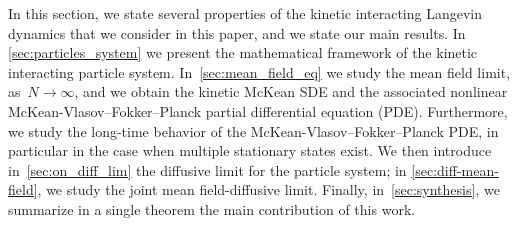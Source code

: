 \documentclass[onefignum,onetabnum]{siamart251216} %
\theoremstyle{plain}
\numberwithin{equation}{section}
\numberwithin{theorem}{section}
\begin{document}
In this section, we state several properties of the kinetic interacting Langevin dynamics that we consider in this paper, and we state our main results. In \cref{sec:particles_system} we present the mathematical framework of the kinetic interacting particle system. In~\cref{sec:mean_field_eq} we study the mean field limit, as~$N \to \infty$, and we obtain the kinetic McKean SDE and the associated nonlinear McKean-Vlasov--Fokker--Planck partial differential equation (PDE). Furthermore, we study the long-time behavior of the McKean-Vlasov--Fokker--Planck PDE, in particular in the case when multiple stationary states exist.
We then introduce in~\cref{sec:on_diff_lim} the diffusive limit for the particle system; in \cref{sec:diff-mean-field}, we study the joint mean field-diffusive limit.
Finally, in~\cref{sec:synthesis}, we summarize in a single theorem the main contribution of this work.
%
%
\end{document}
